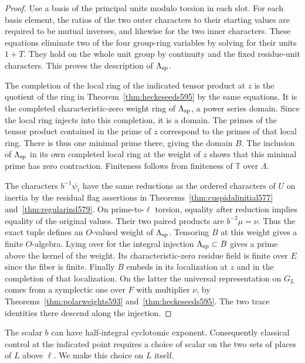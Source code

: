 \documentclass[a4paper,11pt]{article}
\theoremstyle{definition}
\theoremstyle{remark}
\numberwithin{equation}{section}
\begin{document}
\begin{proof}
Use a basis of the principal units modulo torsion in each
slot. For each basis element, the ratios of the two outer
characters to their starting values are required to be
mutual inverses, and likewise for the two inner characters.
These equations eliminate two of the four group-ring
variables by solving for their units \(1+T\). They hold
on the whole unit group by continuity and the fixed
residue-unit characters. This proves the description of
\(\Lambda_{\rm sp}\).

The completion of the local ring of the indicated tensor
product at \(z\) is the quotient of the ring in
Theorem~\ref{thm:heckeseeds595} by the same equations.
It is the completed characteristic-zero weight ring of
\(\Lambda_{\rm sp}\), a power series domain. Since the
local ring injects into this completion, it is a domain.
The primes of the tensor product contained in the prime
of \(z\) correspond to the primes of that local ring.
There is thus one minimal prime there, giving the domain
\(B\). The inclusion of \(\Lambda_{\rm sp}\) in its own
completed local ring at the weight of \(z\) shows that
this minimal prime has zero contraction. Finiteness
follows from finiteness of \(\mathbb T\) over \(\Lambda\).

The characters \(b^{-1}\psi_i\) have the same reductions
as the ordered characters of \(U\) on inertia by the
residual flag assertions in Theorems~\ref{thm:cuspidalinitial577}
and~\ref{thm:regularind579}. On prime-to-\(\ell\) torsion,
equality after reduction implies equality of the original
values. Their two paired products are \(b^{-2}\mu=\nu\).
Thus the exact tuple defines an \(O\)-valued weight of
\(\Lambda_{\rm sp}\). Tensoring \(B\) at this weight
gives a finite \(O\)-algebra. Lying over for the integral
injection \(\Lambda_{\rm sp}\subset B\) gives a prime above
the kernel of the weight. Its characteristic-zero residue
field is finite over \(E\) since the fiber is finite.
Finally \(B\) embeds in its localization at \(z\) and
in the completion of that localization. On the latter
the universal representation on \(G_L\) comes from a
symplectic one over \(F\) with multiplier \(\nu\), by
Theorems~\ref{thm:polarweights593} and~\ref{thm:heckeseeds595}.
The two trace identities there descend along the injection.
\end{proof}

The scalar \(b\) can have half-integral cyclotomic exponent.
Consequently classical control at the indicated point
requires a choice of scalar on the two sets of places of
\(L\) above \(\ell\). We make this choice on \(L\) itself.
\end{document}
